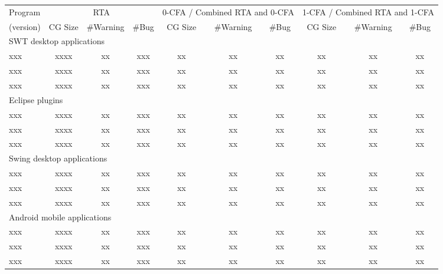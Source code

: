 \begin{table*}[t]
\begin{center}
 \fontsize{9pt}{\baselineskip}\selectfont
\hspace*{-0.2cm}
\begin{tabular}{|l||c|c|c||c|c|c||c|c|c|}
\hline
 Program  &  \multicolumn{3}{|c|}{RTA}& \multicolumn{3}{|c|}{0-CFA / Combined RTA and 0-CFA} & \multicolumn{3}{|c|}{1-CFA / Combined RTA and 1-CFA}  \\
\cline{2-10}
 (version) & CG Size & \#Warning & \#Bug & CG Size & \#Warning & \#Bug & CG Size & \#Warning & \#Bug\\
\hline \hline
\multicolumn{10}{|l|}{SWT desktop applications}   \\
 \hline
 xxx &  xxxx &  xx &  xxx & xx & xx & xx& xx & xx & xx \\
 \hline
 xxx &  xxxx &  xx &  xxx & xx & xx & xx& xx & xx & xx \\
 \hline
 xxx &  xxxx &  xx &  xxx & xx & xx & xx& xx & xx & xx \\
 \hline
 \hline
\multicolumn{10}{|l|}{Eclipse plugins}   \\
 \hline
 xxx &  xxxx &  xx &  xxx & xx & xx & xx& xx & xx & xx \\
 \hline
 xxx &  xxxx &  xx &  xxx & xx & xx & xx& xx & xx & xx \\
 \hline
 xxx &  xxxx &  xx &  xxx & xx & xx & xx& xx & xx & xx \\
 \hline
 \hline
\multicolumn{10}{|l|}{Swing desktop applications}   \\
 \hline
 xxx &  xxxx &  xx &  xxx & xx & xx & xx& xx & xx & xx \\
 \hline
 xxx &  xxxx &  xx &  xxx & xx & xx & xx& xx & xx & xx \\
 \hline
 xxx &  xxxx &  xx &  xxx & xx & xx & xx& xx & xx & xx \\
 \hline
 \hline
\multicolumn{10}{|l|}{Android mobile applications}   \\
 \hline
 xxx &  xxxx &  xx &  xxx & xx & xx & xx& xx & xx & xx \\
 \hline
 xxx &  xxxx &  xx &  xxx & xx & xx & xx& xx & xx & xx \\
 \hline
 xxx &  xxxx &  xx &  xxx & xx & xx & xx& xx & xx & xx \\
\hline
\end{tabular}
\end{center}
\vspace{-15pt}
\end{table*}


